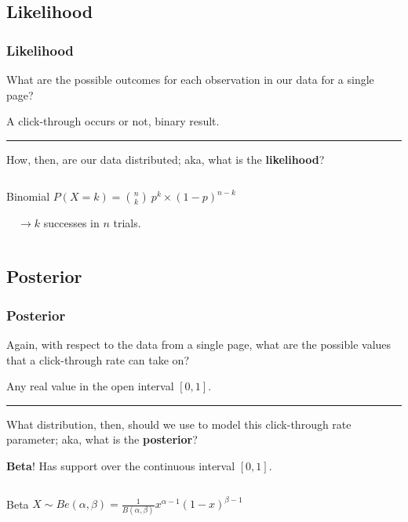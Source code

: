 \documentclass{beamer}
\begin{document}
\subsection{Likelihood}
\begin{frame}
  \frametitle{Likelihood}
  {\large What are the possible outcomes for each observation in our data for a single page?}
  \pause
  \vspace{1mm}

  \begin{center}
    A click-through occurs or not, binary result.
  \end{center}
  \pause
  \noindent\hfil\rule{\textwidth}{.4pt}\hfil

  \vspace{6mm}
  {\large How, then, are our data distributed; aka, what is the \textbf{likelihood}?}
  \pause
  \vspace{1mm}

  \begin{columns}
    \begin{block}{Binomial}
      $ P(X\! =\! k) = {{n}\choose{k}}\: p^k \times (1-p)^{n-k} $

      $\quad\rightarrow k$ successes in $n$ trials.
    \end{block}
  \end{columns}
\end{frame}

\subsection{Posterior}
\begin{frame}
  \frametitle{Posterior}
  {\large Again, with respect to the data from a single page, what are the possible values that a click-through rate can take on?}
  \pause
  \begin{center}
    Any real value in the open interval $ [0, 1] $.
  \end{center}
  \pause
  \vspace{-2mm}
  \noindent\hfil\rule{\textwidth}{.4pt}\hfil
  \vspace{3mm}

  {\large What distribution, then, should we use to model this click-through rate parameter; aka, what is the \textbf{posterior}?}
  \pause

  \begin{center}
    \textbf{Beta}! Has support over the continuous interval $ [0, 1] $.
  \vspace{-2mm}
  \end{center}
  \begin{columns}
    \begin{block}{Beta}
      $ X \sim Be(\alpha, \beta) = \frac{1}{B(\alpha, \beta)} x^{\alpha-1}(1-x)^{\beta-1} $
    \end{block}
  \end{columns}
\end{frame}
\end{document}
